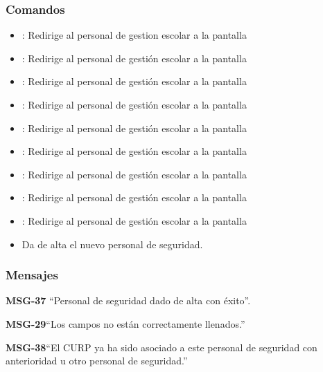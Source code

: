 \subsubsection{Comandos}
\begin{itemize}
	\item {}: Redirige al personal de gestion escolar a la pantalla 
	
	\item {}: Redirige al personal de gestión escolar a la pantalla 
	\item {}: Redirige al personal de gestión escolar a la pantalla 
	
	\item {}: Redirige al personal de gestión escolar a la pantalla 
	\item {}: Redirige al personal de gestión escolar a la pantalla 
	
	\item {}: Redirige al personal de gestión escolar a la pantalla 
	\item {}: Redirige al personal de gestión escolar a la pantalla 
	
	\item {}: Redirige al personal de gestión escolar a la pantalla 
	\item {}: Redirige al personal de gestión escolar a la pantalla     
	
    \item {} Da de alta el nuevo personal de seguridad.
    
\end{itemize}

\subsubsection{Mensajes}

\begin{Citemize}
    \item {\bf MSG-37} ``Personal de seguridad dado de alta con éxito''.
    \item {\bf MSG-29}{``Los campos no están correctamente llenados.''}
    \item {\bf MSG-38}{``El CURP ya ha sido asociado a este personal de seguridad con anterioridad u otro personal de seguridad.''}
    
\end{Citemize}
